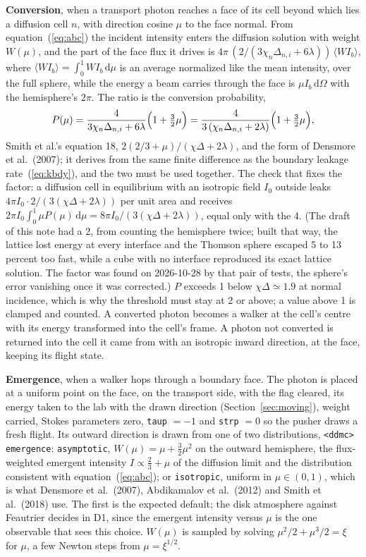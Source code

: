 \documentclass[11pt]{article}
\newcommand{\key}[1]{\texttt{#1}}
\newcommand{\dd}{\mathrm{d}}
\begin{document}
\textbf{Conversion}, when a transport photon reaches a face of its cell beyond which
lies a diffusion cell $n$, with direction cosine $\mu$ to the face normal.  From
equation~(\ref{eq:abc}) the incident intensity enters the diffusion solution with weight
$W(\mu)$, and the part of the face flux it drives is $4\pi\,(2/(3\chi_n\Delta_{n,i} +
6\lambda))\,\langle W I_b\rangle$, where $\langle W I_b\rangle = \int_0^1 W I_b\,\dd\mu$
is an average normalized like the mean intensity, over the full sphere, while the
energy a beam carries through the face is $\mu I_b\,\dd\Omega$ with the hemisphere's
$2\pi$.  The ratio is the conversion probability,
\begin{equation}
  P(\mu) = \frac{4}{3\chi_n\Delta_{n,i} + 6\lambda}\Bigl(1 + \tfrac32\mu\Bigr)
  = \frac{4}{3\,(\chi_n\Delta_{n,i} + 2\lambda)}\Bigl(1 + \tfrac32\mu\Bigr),
  \label{eq:pconv}
\end{equation}
Smith et al.'s equation 18, $2(2/3+\mu)/(\chi\Delta + 2\lambda)$, and the form of
Densmore et al.\ (2007); it derives from the same finite difference as the boundary
leakage rate~(\ref{eq:kbdy}), and the two must be used together.  The check that
fixes the factor: a diffusion cell in equilibrium with an isotropic field $I_0$
outside leaks $4\pi I_0\cdot 2/(3(\chi\Delta+2\lambda))$ per unit area and receives
$2\pi I_0\int_0^1 \mu P(\mu)\,\dd\mu = 8\pi I_0/(3(\chi\Delta + 2\lambda))$, equal
only with the 4.  (The draft of this note had a 2, from counting the hemisphere
twice; built that way, the lattice lost energy at every interface and the Thomson
sphere escaped 5 to 13 percent too fast, while a cube with no interface reproduced
its exact lattice solution.  The factor was found on 2026-10-28 by that pair of
tests, the sphere's error vanishing once it was corrected.)  $P$ exceeds 1 below
$\chi\Delta \simeq 1.9$ at normal incidence, which is why the threshold must stay at
2 or above; a value above 1 is clamped and counted.  A converted photon becomes a
walker at the cell's centre with its energy transformed into the cell's frame.  A
photon not converted is returned into the cell it came from with an isotropic inward
direction, at the face, keeping its flight state.

\textbf{Emergence}, when a walker hops through a boundary face.  The photon is placed
at a uniform point on the face, on the transport side, with the flag cleared, its
energy taken to the lab with the drawn direction (Section~\ref{sec:moving}), weight
carried, Stokes parameters
zero, \texttt{taup} $=-1$ and \texttt{strp} $=0$ so the pusher draws a fresh flight.
Its outward direction is drawn from one of two distributions, \key{<ddmc> emergence}:
\key{asymptotic}, $W(\mu) = \mu + \tfrac32\mu^2$ on the outward hemisphere, the
flux-weighted emergent intensity $I\propto\tfrac23+\mu$ of the diffusion limit and the
distribution consistent with equation~(\ref{eq:abc}); or \key{isotropic}, uniform in
$\mu\in(0,1)$, which is what Densmore et al.\ (2007), Abdikamalov et al.\ (2012) and
Smith et al.\ (2018) use.  The first is the expected default; the disk atmosphere
against Feautrier decides in D1, since the emergent intensity versus $\mu$ is the one
observable that sees this choice.  $W(\mu)$ is sampled by solving
$\mu^2/2 + \mu^3/2 = \xi$ for $\mu$, a few Newton steps from $\mu=\xi^{1/2}$.
\end{document}
